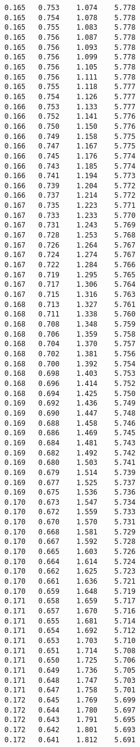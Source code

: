 \begin{verbatim}
   0.165   0.753    1.074    5.778
   0.165   0.754    1.078    5.778
   0.165   0.755    1.083    5.778
   0.165   0.756    1.087    5.778
   0.165   0.756    1.093    5.778
   0.165   0.756    1.099    5.778
   0.165   0.756    1.105    5.778
   0.165   0.756    1.111    5.778
   0.165   0.755    1.118    5.777
   0.165   0.754    1.126    5.777
   0.166   0.753    1.133    5.777
   0.166   0.752    1.141    5.776
   0.166   0.750    1.150    5.776
   0.166   0.749    1.158    5.775
   0.166   0.747    1.167    5.775
   0.166   0.745    1.176    5.774
   0.166   0.743    1.185    5.774
   0.166   0.741    1.194    5.773
   0.166   0.739    1.204    5.772
   0.166   0.737    1.214    5.772
   0.167   0.735    1.223    5.771
   0.167   0.733    1.233    5.770
   0.167   0.731    1.243    5.769
   0.167   0.728    1.253    5.768
   0.167   0.726    1.264    5.767
   0.167   0.724    1.274    5.767
   0.167   0.722    1.284    5.766
   0.167   0.719    1.295    5.765
   0.167   0.717    1.306    5.764
   0.167   0.715    1.316    5.763
   0.168   0.713    1.327    5.761
   0.168   0.711    1.338    5.760
   0.168   0.708    1.348    5.759
   0.168   0.706    1.359    5.758
   0.168   0.704    1.370    5.757
   0.168   0.702    1.381    5.756
   0.168   0.700    1.392    5.754
   0.168   0.698    1.403    5.753
   0.168   0.696    1.414    5.752
   0.168   0.694    1.425    5.750
   0.169   0.692    1.436    5.749
   0.169   0.690    1.447    5.748
   0.169   0.688    1.458    5.746
   0.169   0.686    1.469    5.745
   0.169   0.684    1.481    5.743
   0.169   0.682    1.492    5.742
   0.169   0.680    1.503    5.741
   0.169   0.679    1.514    5.739
   0.169   0.677    1.525    5.737
   0.169   0.675    1.536    5.736
   0.170   0.673    1.547    5.734
   0.170   0.672    1.559    5.733
   0.170   0.670    1.570    5.731
   0.170   0.668    1.581    5.729
   0.170   0.667    1.592    5.728
   0.170   0.665    1.603    5.726
   0.170   0.664    1.614    5.724
   0.170   0.662    1.625    5.723
   0.170   0.661    1.636    5.721
   0.170   0.659    1.648    5.719
   0.171   0.658    1.659    5.717
   0.171   0.657    1.670    5.716
   0.171   0.655    1.681    5.714
   0.171   0.654    1.692    5.712
   0.171   0.653    1.703    5.710
   0.171   0.651    1.714    5.708
   0.171   0.650    1.725    5.706
   0.171   0.649    1.736    5.705
   0.171   0.648    1.747    5.703
   0.171   0.647    1.758    5.701
   0.172   0.645    1.769    5.699
   0.172   0.644    1.780    5.697
   0.172   0.643    1.791    5.695
   0.172   0.642    1.801    5.693
   0.172   0.641    1.812    5.691

\end{verbatim}
